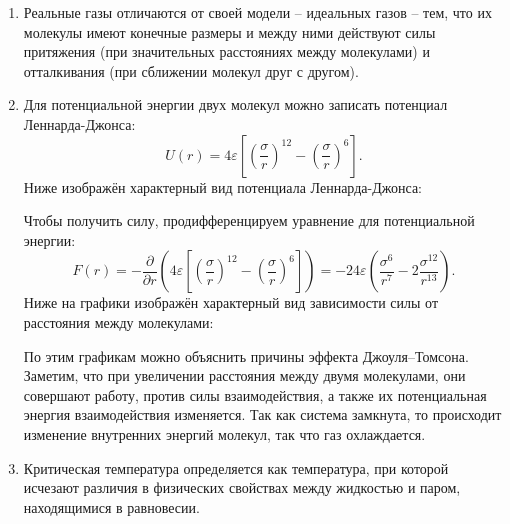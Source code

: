 \documentclass[a4paper,12pt]{article} %
\begin{document}
\begin{enumerate}
	\item Реальные газы отличаются от своей модели -- идеальных газов -- тем, что их молекулы имеют конечные размеры и между ними действуют силы притяжения (при
	значительных расстояниях между молекулами) и отталкивания (при сближении молекул друг с другом).
	\item Для потенциальной энергии двух молекул можно записать потенциал Леннарда-Джонса: \[ U(r)=4\varepsilon\left[\left(\frac{\sigma}{r}\right)^{12}-\left(\frac{\sigma}{r}\right)^6\right]. \] Ниже изображён характерный вид потенциала Леннарда-Джонса:
	
	\begin{center}
	\end{center}
	Чтобы получить силу, продифференцируем уравнение для потенциальной энергии: \[ 
	F(r)=-\frac{\partial}{\partial r}\left(4\varepsilon\left[\left(\frac{\sigma}{r}\right)^{12}-\left(\frac{\sigma}{r}\right)^6\right]\right)=-24\varepsilon\left(\frac{\sigma^6}{r^7}-2\frac{\sigma^{12}}{r^{13}}\right).
	 \]
	 Ниже на графики изображён характерный вид зависимости силы от расстояния между молекулами:
	 \begin{center}
	 \end{center}
 По этим графикам можно объяснить причины эффекта Джоуля–Томсона. Заметим,
 что при увеличении расстояния между двумя молекулами, они совершают работу,
 против силы взаимодействия, а также их потенциальная энергия взаимодействия
 изменяется. Так как система замкнута, то происходит изменение внутренних энергий
 молекул, так что газ охлаждается.
 \item Критическая температура определяется как температура, при которой исчезают различия в физических свойствах между жидкостью и паром, находящимися в равновесии.
 

\end{enumerate}
\end{document}
